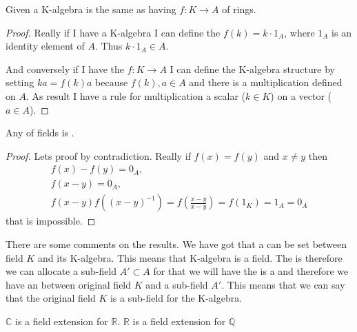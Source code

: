 \begin{lemma}
Given a K-algebra is the same as
having  $f: K \rightarrow A$ of rings.
\begin{proof}
Really if I have a K-algebra I can define the
 $f(k) = k \cdot 1_A$, where $1_A$ is an
identity element of $A$. Thus $k \cdot 1_A \in A$.

And conversely if I have the 
$f: K \rightarrow A$
I can define the K-algebra structure by setting
$k a = f(k) a$ because $f(k), a \in A$ and there is a multiplication
defined on $A$. As result I have a rule for multiplication a scalar
($k \in K$) on a vector ($a \in A$).
\end{proof}
\end{lemma}

\begin{lemma}
Any  of fields is
.
\begin{proof}
Lets proof by contradiction.
Really if $f(x) = f(y)$ and $x \ne y$ then
\begin{eqnarray}
  f(x) - f(y) = 0_A,
  \nonumber \\
  f(x - y) = 0_A,
  \nonumber \\
  f(x - y) f(\left(x - y\right)^{-1}) =
  f\left(\frac{x - y}{x - y}\right) = f(1_K) = 1_A = 0_A
  \nonumber
\end{eqnarray}
that is impossible.
\end{proof}
\end{lemma}

There are some comments on the results. We have got that a
 can be set between field $K$ and its
K-algebra. This means that K-algebra is a field.
The  is 
therefore we can allocate a sub-field $A' \subset A$ for that we will
have the  is a  and
therefore we have an  between original field $K$
and a sub-field $A'$. This means that we can say that the original
field $K$ is a sub-field for the K-algebra.

\begin{example}
  $\mathbb{C}$ is a field extension for $\mathbb{R}$.
  $\mathbb{R}$ is a field extension for $\mathbb{Q}$
  \label{ex:fieldextension}
\end{example}

